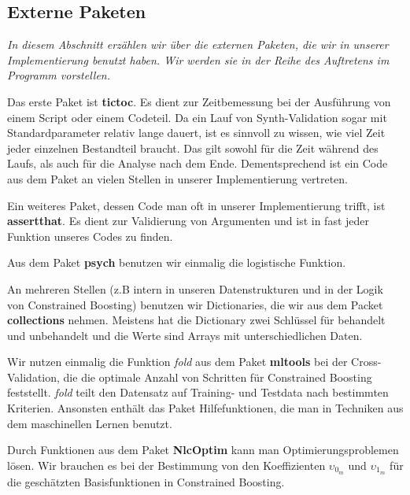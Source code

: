 \documentclass[12pt,a4paper,twoside]{scrartcl}
\numberwithin{equation}{section}
\begin{document}
\subsection{Externe Paketen}\label{subsec:externePaketen}

\noindent
\emph{In diesem Abschnitt erzählen wir über die externen Paketen, die wir in unserer Implementierung benutzt haben. Wir werden sie in der Reihe des Auftretens im Programm vorstellen.}\par

\noindent
Das erste Paket ist \textbf{tictoc}. Es dient zur Zeitbemessung bei der Ausführung von einem Script oder einem Codeteil. Da ein Lauf von Synth-Validation sogar mit Standardparameter relativ lange dauert, ist es sinnvoll zu wissen, wie viel Zeit jeder einzelnen Bestandteil braucht. Das gilt sowohl für die Zeit während des Laufs, als auch für die Analyse nach dem Ende. Dementsprechend ist ein Code aus dem Paket an vielen Stellen in unserer Implementierung vertreten.
\par

\noindent
Ein weiteres Paket, dessen Code man oft in unserer Implementierung trifft, ist \textbf{assertthat}. Es dient zur Validierung von Argumenten und ist in fast jeder Funktion unseres Codes zu finden.
\par

\noindent
Aus dem Paket \textbf{psych} benutzen wir einmalig die logistische Funktion.\par 

\noindent
An mehreren Stellen (z.B intern in unseren Datenstrukturen und in der Logik von Constrained Boosting) benutzen wir Dictionaries, die wir aus dem Packet \textbf{collections} nehmen. Meistens hat die Dictionary zwei Schlüssel für behandelt und unbehandelt und die Werte sind Arrays mit unterschiedlichen Daten.\par

\noindent
Wir nutzen einmalig die Funktion \emph{fold} aus dem Paket \textbf{mltools} bei der Cross-Validation, die die optimale Anzahl von Schritten für Constrained Boosting feststellt. \emph{fold} teilt den Datensatz auf Training- und Testdata nach bestimmten Kriterien. Ansonsten enthält das Paket Hilfefunktionen, die man in Techniken aus dem maschinellen Lernen benutzt.\par 
 
\noindent
Durch Funktionen aus dem Paket \textbf{NlcOptim} kann man Optimierungsproblemen lösen. Wir brauchen es bei der Bestimmung von den Koeffizienten $\upsilon_{0_m}$ und $\upsilon_{1_m}$ für die geschätzten Basisfunktionen in Constrained Boosting.\par 
 
\end{document}
